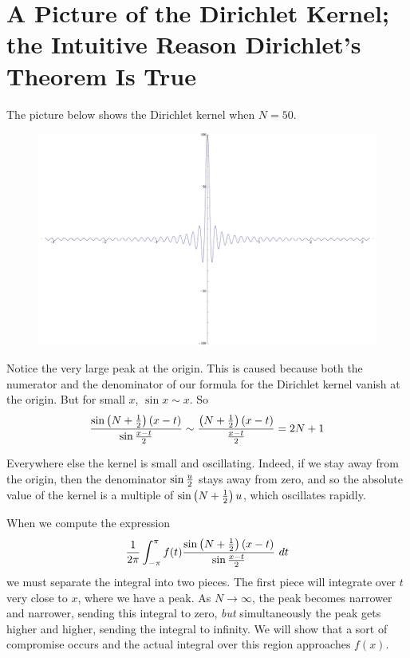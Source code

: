 \documentclass[11pt, oneside]{amsart}
\begin{document}
\section{A Picture of the Dirichlet Kernel; the Intuitive Reason Dirichlet's Theorem Is True}

The picture below shows the Dirichlet kernel when $N = 50$. 

\begin{figure}[htbp] %
   \centering
   \includegraphics[width=5in]{Graphics/four}
\end{figure}

Notice the very large peak at the origin. This is caused because both the numerator and the denominator of our formula for the Dirichlet kernel vanish at the origin. But for small $x$, $\sin x \sim x$. So 
$${{\sin \left( N + {1 \over 2} \right) (x - t)} \over {\sin {{x - t} \over 2}}} \sim {{\left( N + {1 \over 2} \right) (x - t)} \over { {{x - t} \over 2}}}= 2N + 1$$

Everywhere else the kernel is small and oscillating. Indeed, if we stay away from the origin, then the denominator $\sin {u \over 2}$ stays away from zero, and so the absolute value of the kernel is a multiple of $\sin \left( N + {1 \over 2}\right)u$, which oscillates rapidly.

When we compute the expression
$$ {1 \over {2 \pi}} \int_{- \pi}^\pi f(t) {{\sin \left(N + {1 \over 2}\right)(x - t)} \over {\sin {{x - t} \over 2}}} \ dt $$
we must separate the integral into two pieces. The first piece will integrate over $t$ very close to $x$, where we have a peak. As $N \rightarrow \infty$, the peak becomes narrower and narrower, sending this integral to zero, {\em but} simultaneously the peak gets higher and higher, sending the integral to infinity. We will show that a sort of compromise occurs and the actual integral over this region approaches $f(x)$.
\end{document}

